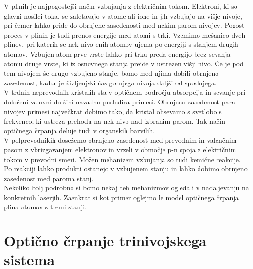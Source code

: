 \noindent
V plinih je najpogostejši način vzbujanja z električnim tokom. Elektroni,
ki so glavni nosilci toka, se zaletavajo v atome ali ione in jih vzbujajo
na višje nivoje, pri čemer lahko pride do obrnjene zasedenosti med
nekim parom nivojev. Pogost proces v plinih je tudi prenos energije
med atomi s trki. Vzemimo mešanico dveh plinov, pri katerih se nek
nivo enih atomov ujema po energiji s stanjem drugih atomov. Vzbujen
atom prve vrste lahko pri trku preda energijo brez sevanja atomu druge
vrste, ki iz osnovnega stanja preide v ustrezen višji nivo. Če je
pod tem nivojem še drugo vzbujeno stanje, bomo med njima dobili obrnjeno
zasedenost, kadar je življenjski čas gornjega nivoja daljši od spodnjega.\\

\noindent
V trdnih neprevodnih kristalih sta v optičnem področju absorpcija
in sevanje pri določeni valovni dolžini navadno posledica primesi.
Obrnjeno zasedenost para nivojev primesi največkrat dobimo tako, da
kristal obsevamo s svetlobo s frekvenco, ki ustreza prehodu na nek
nivo nad izbranim parom. Tak način optičnega črpanja deluje tudi v
organskih barvilih.\\

\noindent
V polprevodnikih dosežemo obrnjeno zasedenost med prevodnim in valenčnim
pasom z vbrizgavanjem elektronov in vrzeli v območje p-n spoja z električnim
tokom v prevodni smeri. Možen mehanizem vzbujanja so tudi kemične
reakcije. Po reakciji lahko produkti ostanejo v vzbujenem stanju
in lahko dobimo obrnjeno zasedenost med paroma stanj.\\

\noindent
Nekoliko bolj podrobno si bomo nekaj teh mehanizmov ogledali v nadaljevanju
na konkretnih laserjih. Zaenkrat si kot primer oglejmo le model optičnega
črpanja plina atomov s tremi stanji.


\section{Optično črpanje trinivojskega sistema}

